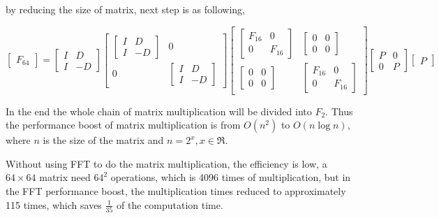 \documentclass[12pt]{article}
\begin{document}
		by reducing the size of matrix, next step is as following,
		\begin{center}
			\centering
			
			$
			\begin{bmatrix}
			F_{64}
			\end{bmatrix}
			=
			\begin{bmatrix}
			I & D\\
			I & -D
			\end{bmatrix}
			\begin{bmatrix}
				\begin{bmatrix}
				I & D\\
				I & -D
				\end{bmatrix} & 0\\
				0 & \begin{bmatrix}
				I & D\\
				I & -D
				\end{bmatrix}
			\end{bmatrix}
			\begin{bmatrix}
				\begin{bmatrix}
				F_{16} & 0\\
				0 & F_{16}
				\end{bmatrix} & \begin{bmatrix}
				0 & 0\\
				0 & 0
				\end{bmatrix} \\
				\begin{bmatrix}
				0 & 0\\
				0 & 0
				\end{bmatrix} & \begin{bmatrix}
				F_{16} & 0\\
				0 & F_{16}
				\end{bmatrix}
			\end{bmatrix}
			\begin{bmatrix}
			P & 0\\
			0 & P
			\end{bmatrix}
			\begin{bmatrix}
				P
			\end{bmatrix}
			$
			
			
		\end{center}
		In the end the whole chain of matrix multiplication will be divided into $F_{2}$. Thus the performance boost of matrix multiplication is from $O(n^{2})$ to $O(n\log n)$, where $n$ is the size of the matrix and $n = 2^{x}, x \in \Re$.
		
		Without using FFT to do the matrix multiplication, the efficiency is low, a $64 \times 64$ matrix need $64^{2}$ operations, which is 4096 times of multiplication, but in the FFT performance boost, the multiplication times reduced to approximately 115 times, which saves $\frac{1}{35}$ of the computation time.
		
\end{document}
